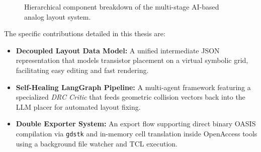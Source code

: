 \begin{figure}[H]
{}
    \caption{Hierarchical component breakdown of the multi-stage AI-based analog layout system.}
    \label{fig:mindmap_system}
\end{figure}

The specific contributions detailed in this thesis are:
\begin{itemize}
    \item \textbf{Decoupled Layout Data Model:} A unified intermediate JSON representation that models transistor placement on a virtual symbolic grid, facilitating easy editing and fast rendering.
    \item \textbf{Self-Healing LangGraph Pipeline:} A multi-agent framework featuring a specialized \textit{DRC Critic} that feeds geometric collision vectors back into the LLM placer for automated layout fixing.
    \item \textbf{Double Exporter System:} An export flow supporting direct binary OASIS compilation via \texttt{gdstk} and in-memory cell translation inside OpenAccess tools using a background file watcher and TCL execution.
\end{itemize}

\label{sec:organization}

